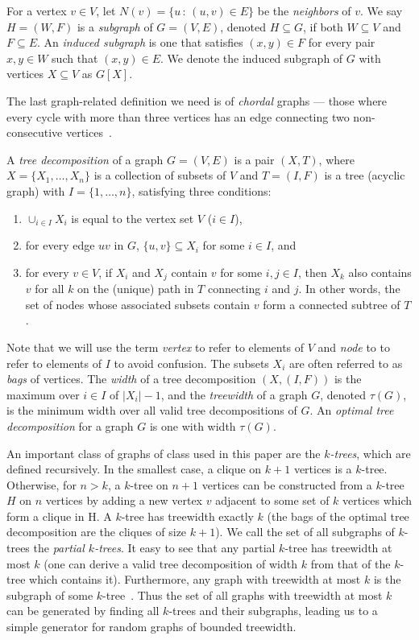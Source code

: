 \documentclass[conference]{IEEEtran}
\begin{document}
For a vertex $v \in V$, let $N(v) = \{u\,:\,(u,v) \in E\}$ be the
{\em neighbors} of $v$. We say $H = (W,F)$ is a {\em subgraph} of $G = (V,E)$, denoted
$H \subseteq G$,  if both $W \subseteq V$ and $F \subseteq E$.
An  {\em induced subgraph} is one that satisfies $(x,y) \in F$ for every pair $x,y \in W$ such that $(x,y)\in E$. We denote the induced subgraph of $G$ with
vertices $X \subseteq V$ as $G[X]$.

The last graph-related definition we need is of {\em chordal} graphs ---
those where every cycle with more than three vertices has an edge connecting two non-consecutive
vertices~\cite{Gavril1974intersection}.

A {\em tree decomposition} of a
graph $G = (V,E)$ is a pair $(X,T)$, where $X = \{X_1, \ldots, X_n\}$
is a collection of subsets of $V$ and $T = (I,F)$ is a tree (acyclic graph) with $I =
\{1,\ldots,n\}$, satisfying three conditions:
\begin{enumerate}
\item $\cup_{i\in I} X_i$ is equal to the vertex set $V$
  ($i \in I$),
\item for every edge $uv$ in $G$, $\{u,v\} \subseteq X_i$ for some $i
  \in I$, and
\item for every $v \in V$, if $X_i$ and $X_j$ contain $v$ for some
  $i,j \in I$, then $X_k$ also contains $v$ for all $k$ on the
  (unique) path in $T$ connecting $i$ and $j$. In other words, the set
  of nodes whose associated subsets contain $v$ form a connected subtree of
  $T$.
\end{enumerate}

Note that we will use the term {\em vertex} to refer to elements of $V$ and {\em node}
to to refer to elements of $I$ to avoid confusion. The subsets $X_i$ are often referred
to as \emph{bags} of vertices. The {\em width} of a tree decomposition
$(X, (I,F))$ is the maximum over $i \in I$ of
$|X_i|-1$, and the {\em treewidth} of a graph $G$, denoted $\tau(G)$,
is the minimum width over all valid tree decompositions of $G$. An {\em optimal tree
  decomposition} for a graph $G$ is one with width $\tau(G)$.

An important class of graphs of class used in this paper are the {\em
  $k$-trees}, which are defined recursively. In the smallest
case, a clique on $k+1$ vertices is a $k$-tree. Otherwise,  for $n >
k$, a $k$-tree on $n+1$ vertices can be constructed from a
$k$-tree $H$ on $n$ vertices by adding a new vertex $v$ adjacent to
some set of $k$ vertices which form a clique in H. A $k$-tree has
treewidth exactly $k$ (the bags of the optimal tree decomposition are
the cliques of size $k+1$). We call the set of all subgraphs of
$k$-trees the {\em partial $k$-trees}.  It easy to see that any
partial $k$-tree has treewidth at most $k$ (one can derive a valid
tree decomposition of width $k$ from that of the $k$-tree which
contains it). Furthermore, any graph with treewidth at most $k$ is
the subgraph of some $k$-tree~\cite{Leeuwen1990}. Thus the set of all graphs with
treewidth at most $k$ can be generated by finding all $k$-trees and
their subgraphs, leading us to a simple generator for random graphs
of bounded treewidth.
\end{document}
